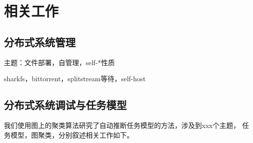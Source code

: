\chapter{相关工作}
\label{chap:related}

\section{分布式系统管理}

主题：文件部署，自管理，self-*性质

sharkfs，bittorrent，splitstream等待，self-host

\section{分布式系统调试与任务模型}

我们使用图上的聚类算法研究了自动推断任务模型的方法，涉及到xxx个主题，
任务模型，图聚类，分别叙述相关工作如下。
